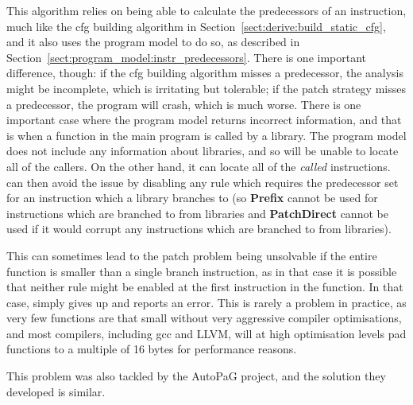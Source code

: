 This algorithm relies on being able to calculate the predecessors of
an instruction, much like the \gls{cfg} building algorithm in
Section~\ref{sect:derive:build_static_cfg}, and it also uses the
program model to do so, as described in
Section~\ref{sect:program_model:instr_predecessors}.   There is one important difference, though: if
the \gls{cfg} building algorithm misses a predecessor, the analysis might be
incomplete, which is irritating but tolerable; if the patch strategy
misses a predecessor, the program will crash, which is much worse.
There is one important case where the program model returns incorrect
information, and that is when a function in the main program is called
by a library.  The program model does not include any information
about libraries, and so will be unable to locate all of the callers.
On the other hand, it can locate all of the \emph{called}
instructions.  {\Technique} can then avoid the issue by disabling any
rule which requires the predecessor set for an instruction which a
library branches to (so \textbf{Prefix} cannot be used for
instructions which are branched to from libraries and
\textbf{PatchDirect} cannot be used if it would corrupt any
instructions which are branched to from libraries).

This can sometimes lead to the patch problem being unsolvable if the
entire function is smaller than a single branch instruction, as in
that case it is possible that neither rule might be enabled at the
first instruction in the function.  In that case, {\implementation}
simply gives up and reports an error.  This is rarely a problem in
practice, as very few functions are that small without very aggressive
compiler optimisations, and most compilers, including
gcc\cite[Section~3.10]{Stallman2010} and LLVM\needCite{}, will at high
optimisation levels pad functions to a multiple of 16 bytes for
performance reasons.

This problem was also tackled by the AutoPaG project, and the solution
they developed is similar. 

